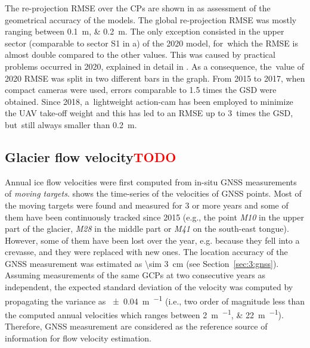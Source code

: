 The re-projection RMSE over the CPs are shown in  as assessment
of the geometrical accuracy of the models.
The global re-projection RMSE was mostly ranging between \SIlist{0.1;0.2}{\meter}.
The only exception consisted in the {\color{red} upper sector (comparable to sector S1 in
a) of the 2020 model}, for~which the RMSE is almost double
compared to the other values.
{\color{red}
This was caused by practical problems occurred in 2020, explained in detail in
.
}
As a consequence, the~value of 2020 RMSE was split in two different bars in the graph.
From 2015 to 2017, when compact cameras were used, errors comparable to 1.5 times the GSD
were obtained.
Since 2018, a~lightweight action-cam has been employed to minimize the UAV take-off
weight and this has led to an RMSE up to 3~times the GSD, but~still always smaller than
\SI{0.2}{\meter}.

\subsection{Glacier flow velocity\textcolor{red}{TODO}}\label{sec:3:res:velocity}

Annual ice flow velocities were first computed from in-situ GNSS measurements of \textit{moving targets}.
 shows the time-series of the velocities of GNSS points. 
Most of the moving targets were found and measured for 3 or more years and some of them have been continuously tracked since 2015 (e.g., the point \textit{M10} in the upper part of the glacier, \textit{M28} in the middle part or \textit{M41} on the south-east tongue). 
However, some of them have been lost over the year, e.g. because they fell into a crevasse, and they were replaced with new ones. 
The location accuracy of the GNSS measurement was estimated as \qty{\sim 3}{\centi\meter} (see Section~\ref{sec:3:gnss}). 
Assuming measurements of the same GCPs at two consecutive years as independent,
the expected standard deviation of the velocity was computed by propagating the variance as \qty{\pm 0.04}{\meter\per\year} (i.e., two order of magnitude less than the computed annual velocities which ranges between \qtylist{2;22}{\meter\per\year}).
Therefore, GNSS measurement are considered as the reference source of information for flow velocity estimation.

